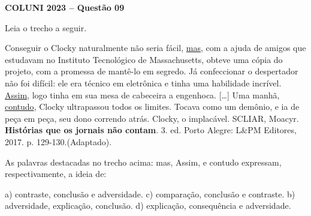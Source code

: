 \textbf{COLUNI 2023 -- Questão 09}\par\medskip Leia o trecho a seguir.

\par

Conseguir o Clocky naturalmente não seria fácil, \underline{mas}, com a ajuda de amigos que estudavam no Instituto Tecnológico de Massachusetts, obteve uma cópia do projeto, com a promessa de mantê-lo em segredo. Já confeccionar o despertador não foi difícil: ele era técnico em eletrônica e tinha uma habilidade incrível. \underline{Assim}, logo tinha em sua mesa de cabeceira a engenhoca. […] Uma manhã, \underline{contudo}, Clocky ultrapassou todos os limites. Tocava como um demônio, e ia de peça em peça, seu dono correndo atrás. Clocky, o implacável. SCLIAR, Moacyr. \textbf{Histórias que os jornais não contam}. 3. ed. Porto Alegre: L\&PM Editores, 2017. p. 129-130.(Adaptado).

\par

As palavras destacadas no trecho acima: mas, Assim, e contudo expressam, respectivamente, a ideia de:

\par

a) contraste, conclusão e adversidade.                               c) comparação, conclusão e contraste. b) adversidade, explicação, conclusão.                               d) explicação, consequência e adversidade.
